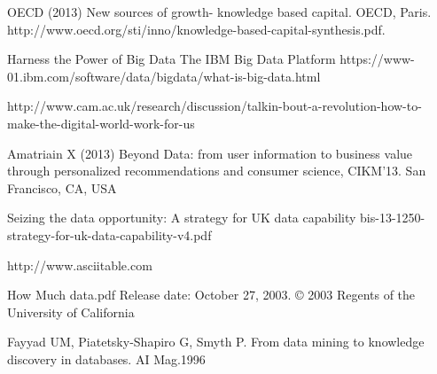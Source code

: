 \documentclass[10pt,journal,compsoc]{IEEEtran}
\begin{document}
\begin{thebibliography}{1}

OECD (2013) New sources of growth- knowledge based capital. OECD, Paris. 
http://www.oecd.org/sti/inno/knowledge-based-capital-synthesis.pdf.

Harness the Power of Big Data The IBM Big Data Platform
https://www-01.ibm.com/software/data/bigdata/what-is-big-data.html

http://www.cam.ac.uk/research/discussion/talkin-bout-a-revolution-how-to-make-the-digital-world-work-for-us

Amatriain X (2013) Beyond Data: from user information to business value through personalized recommendations
and consumer science, CIKM’13. San Francisco, CA, USA

Seizing the data opportunity: A strategy for UK data capability
bis-13-1250-strategy-for-uk-data-capability-v4.pdf

http://www.asciitable.com

How Much data.pdf
Release date: October 27, 2003. © 2003 Regents of the University of California

Fayyad UM, Piatetsky-Shapiro G, Smyth P. From data mining to knowledge discovery in databases. AI Mag.1996

\end{thebibliography}
\end{document}

